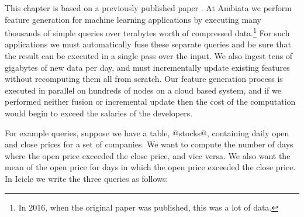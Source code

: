 \label{icicle:s:Introduction}

This chapter is based on a previously published paper \citep{robinson2016icicle}.
At Ambiata we perform feature generation for machine learning applications by executing many thousands of simple queries over terabytes worth of compressed data.\footnote{In 2016, when the original paper was published, this was a lot of data.}
For such applications we must automatically fuse these separate queries and be sure that the result can be executed in a single pass over the input.
We also ingest tens of gigabytes of new data per day, and must incrementally update existing features without recomputing them all from scratch.
Our feature generation process is executed in parallel on hundreds of nodes on a cloud based system, and if we performed neither fusion or incremental update then the cost of the computation would begin to exceed the salaries of the developers.

For example queries, suppose we have a table, @stocks@, containing daily open and close prices for a set of companies. We want to compute the number of days where the open price exceeded the close price, and vice versa. We also want the mean of the open price for days in which the open price exceeded the close price. In Icicle we write the three queries as follows:


